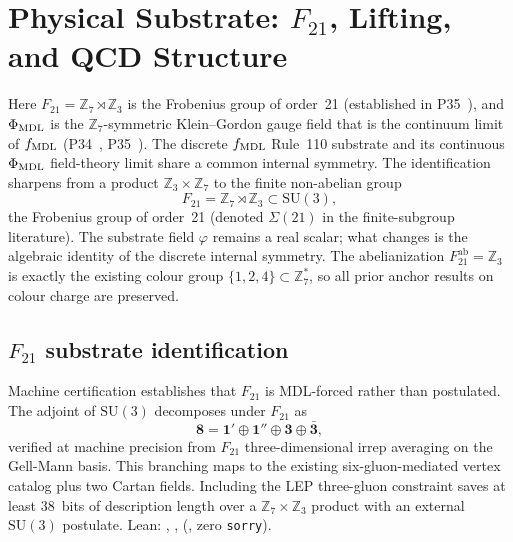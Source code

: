 
\section{Physical Substrate: \texorpdfstring{$F_{21}$}{F21}, Lifting, and QCD Structure}
\label{sec:physical_substrate}

Here $F_{21} = \mathbb{Z}_7 \rtimes \mathbb{Z}_3$ is the Frobenius group of order~21 (established in P35~\cite{SpivackGTEUnification}), and $\Phi_{\rm MDL}$ is the $\mathbb{Z}_7$-symmetric Klein--Gordon gauge field that is the continuum limit of $f_{\rm MDL}$ (P34~\cite{SpivackGTEMobius}, P35~\cite{SpivackGTEUnification}).
The discrete $f_{\rm MDL}$ Rule~110 substrate and its continuous $\Phi_{\rm MDL}$ field-theory limit share a common internal symmetry. The identification sharpens from a product $\mathbb{Z}_3 \times \mathbb{Z}_7$ to the finite non-abelian group
\begin{equation}
F_{21} = \mathbb{Z}_7 \rtimes \mathbb{Z}_3 \subset \mathrm{SU}(3),
\label{eq:f21_def}
\end{equation}
the Frobenius group of order~21 (denoted $\Sigma(21)$ in the finite-subgroup literature). The substrate field $\varphi$ remains a real scalar; what changes is the algebraic identity of the discrete internal symmetry. The abelianization $F_{21}^{\mathrm{ab}} = \mathbb{Z}_3$ is exactly the existing colour group $\{1,2,4\} \subset \mathbb{Z}_7^*$, so all prior anchor results on colour charge are preserved.

\subsection{\texorpdfstring{$F_{21}$}{F21} substrate identification}
\label{sec:f21_substrate}

Machine certification establishes that $F_{21}$ is MDL-forced rather than postulated.
The adjoint of $\mathrm{SU}(3)$ decomposes under $F_{21}$ as
\begin{equation}
\mathbf{8} = \mathbf{1}' \oplus \mathbf{1}'' \oplus \mathbf{3} \oplus \bar{\mathbf{3}},
\label{eq:f21_branching}
\end{equation}
verified at machine precision from $F_{21}$ three-dimensional irrep averaging on the Gell-Mann basis. This branching maps to the existing six-gluon-mediated vertex catalog plus two Cartan fields.
Including the LEP three-gluon constraint saves at least 38~bits of description length over a $\mathbb{Z}_7 \times \mathbb{Z}_3$ product with an external $\mathrm{SU}(3)$ postulate.
Lean: , , 
(, zero \texttt{sorry}).

